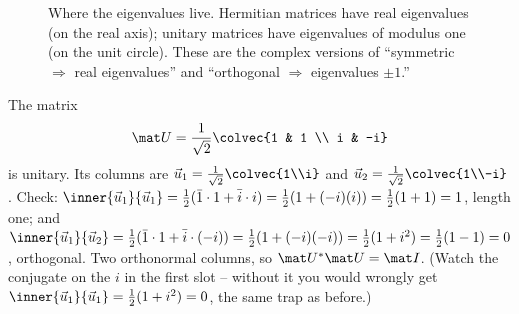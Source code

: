 \begin{figure}[H]
\centering
{}
\caption{Where the eigenvalues live. Hermitian matrices have real eigenvalues (on
the real axis); unitary matrices have eigenvalues of modulus one (on the unit
circle). These are the complex versions of ``symmetric $\Rightarrow$ real
eigenvalues'' and ``orthogonal $\Rightarrow$ eigenvalues $\pm 1$.''}
\label{ch32:eiglocus}
\end{figure}

\begin{example}\label{ch32:unitaryex}
The matrix
\[
  \mat U = \frac{1}{\sqrt 2}\colvec{1 & 1 \\ i & -i}
\]
is unitary. Its columns are $\vec u_1=\tfrac1{\sqrt2}\colvec{1\\i}$ and
$\vec u_2=\tfrac1{\sqrt2}\colvec{1\\-i}$. Check:
$\inner{\vec u_1}{\vec u_1} = \tfrac12(\bar 1\cdot 1 + \bar i\cdot i)
= \tfrac12(1 + (-i)(i)) = \tfrac12(1+1)=1$, length one; and
$\inner{\vec u_1}{\vec u_2} = \tfrac12(\bar 1\cdot 1 + \bar i\cdot(-i))
= \tfrac12(1 + (-i)(-i)) = \tfrac12(1 + i^2) = \tfrac12(1-1) = 0$, orthogonal.
Two orthonormal columns, so $\mat U^{*}\mat U=\mat I$. (Watch the conjugate on the
$i$ in the first slot -- without it you would wrongly get $\inner{\vec u_1}{\vec
u_1}=\tfrac12(1+i^2)=0$, the same trap as before.)
\end{example}

